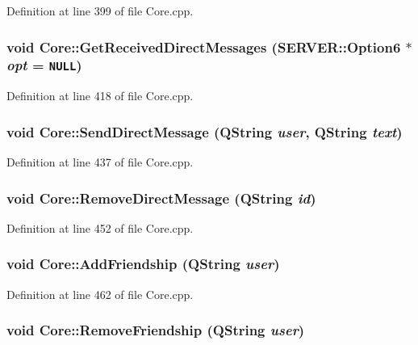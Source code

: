 Definition at line 399 of file Core.cpp.\hypertarget{classCore_5496ee42ce9d32aa0f98a2d56e3bbddf}{
\subsubsection{\setlength{\rightskip}{0pt plus 5cm}void Core::GetReceivedDirectMessages ({\bf SERVER::Option6} $\ast$ {\em opt} = {\tt NULL})}}
\label{classCore_5496ee42ce9d32aa0f98a2d56e3bbddf}




Definition at line 418 of file Core.cpp.\hypertarget{classCore_f6afb71b9114a90e9b9856f64a6fe9cf}{
\subsubsection{\setlength{\rightskip}{0pt plus 5cm}void Core::SendDirectMessage (QString {\em user}, \/  QString {\em text})}}
\label{classCore_f6afb71b9114a90e9b9856f64a6fe9cf}




Definition at line 437 of file Core.cpp.\hypertarget{classCore_d98d496c44ebff775698737f8edbde44}{
\subsubsection{\setlength{\rightskip}{0pt plus 5cm}void Core::RemoveDirectMessage (QString {\em id})}}
\label{classCore_d98d496c44ebff775698737f8edbde44}




Definition at line 452 of file Core.cpp.\hypertarget{classCore_3df3b62fa5366492a3eb4bba99f1849a}{
\subsubsection{\setlength{\rightskip}{0pt plus 5cm}void Core::AddFriendship (QString {\em user})}}
\label{classCore_3df3b62fa5366492a3eb4bba99f1849a}




Definition at line 462 of file Core.cpp.\hypertarget{classCore_95ce85046d01f3d5d6928f06e8aab99c}{
\subsubsection{\setlength{\rightskip}{0pt plus 5cm}void Core::RemoveFriendship (QString {\em user})}}
\label{classCore_95ce85046d01f3d5d6928f06e8aab99c}




